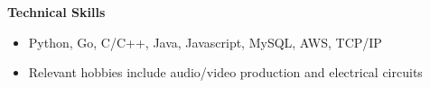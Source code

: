\documentclass[letterpaper,11pt]{article}
\newcommand{\resitem}[1]{\item #1 \vspace{-2pt}}
\newcommand{\resheading}[1]{{\large \colorbox{mygrey}{\begin{minipage}{\textwidth}{\textbf{#1 \vphantom{p\^{E}}}}\end{minipage}}}}
\begin{document}
\resheading{Technical Skills}
\begin{itemize}
\resitem{Python, Go, C/C++, Java, Javascript, MySQL, AWS, TCP/IP}
\resitem{Relevant hobbies include audio/video production and electrical circuits}
\end{itemize}

\end{document}

